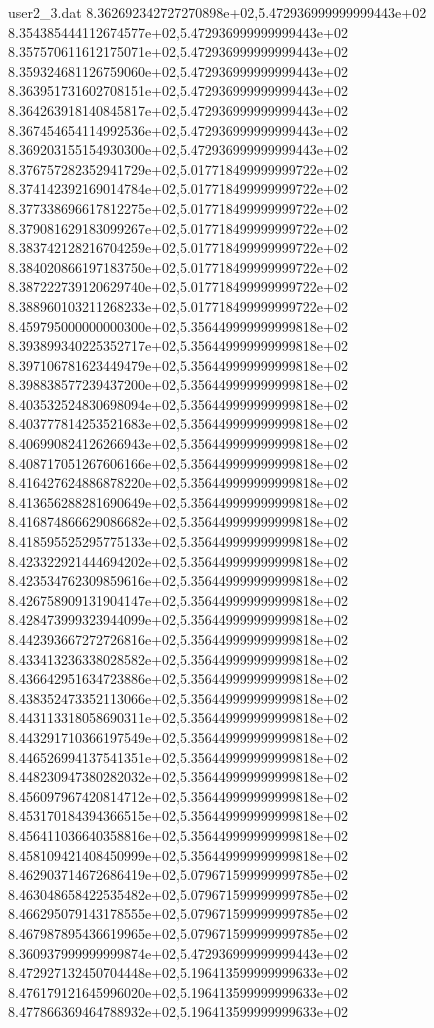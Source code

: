 \begin{filecontents}{user2_3.dat}
8.362692342727270898e+02,5.472936999999999443e+02
8.354385444112674577e+02,5.472936999999999443e+02
8.357570611612175071e+02,5.472936999999999443e+02
8.359324681126759060e+02,5.472936999999999443e+02
8.363951731602708151e+02,5.472936999999999443e+02
8.364263918140845817e+02,5.472936999999999443e+02
8.367454654114992536e+02,5.472936999999999443e+02
8.369203155154930300e+02,5.472936999999999443e+02
8.376757282352941729e+02,5.017718499999999722e+02
8.374142392169014784e+02,5.017718499999999722e+02
8.377338696617812275e+02,5.017718499999999722e+02
8.379081629183099267e+02,5.017718499999999722e+02
8.383742128216704259e+02,5.017718499999999722e+02
8.384020866197183750e+02,5.017718499999999722e+02
8.387222739120629740e+02,5.017718499999999722e+02
8.388960103211268233e+02,5.017718499999999722e+02
8.459795000000000300e+02,5.356449999999999818e+02
8.393899340225352717e+02,5.356449999999999818e+02
8.397106781623449479e+02,5.356449999999999818e+02
8.398838577239437200e+02,5.356449999999999818e+02
8.403532524830698094e+02,5.356449999999999818e+02
8.403777814253521683e+02,5.356449999999999818e+02
8.406990824126266943e+02,5.356449999999999818e+02
8.408717051267606166e+02,5.356449999999999818e+02
8.416427624886878220e+02,5.356449999999999818e+02
8.413656288281690649e+02,5.356449999999999818e+02
8.416874866629086682e+02,5.356449999999999818e+02
8.418595525295775133e+02,5.356449999999999818e+02
8.423322921444694202e+02,5.356449999999999818e+02
8.423534762309859616e+02,5.356449999999999818e+02
8.426758909131904147e+02,5.356449999999999818e+02
8.428473999323944099e+02,5.356449999999999818e+02
8.442393667272726816e+02,5.356449999999999818e+02
8.433413236338028582e+02,5.356449999999999818e+02
8.436642951634723886e+02,5.356449999999999818e+02
8.438352473352113066e+02,5.356449999999999818e+02
8.443113318058690311e+02,5.356449999999999818e+02
8.443291710366197549e+02,5.356449999999999818e+02
8.446526994137541351e+02,5.356449999999999818e+02
8.448230947380282032e+02,5.356449999999999818e+02
8.456097967420814712e+02,5.356449999999999818e+02
8.453170184394366515e+02,5.356449999999999818e+02
8.456411036640358816e+02,5.356449999999999818e+02
8.458109421408450999e+02,5.356449999999999818e+02
8.462903714672686419e+02,5.079671599999999785e+02
8.463048658422535482e+02,5.079671599999999785e+02
8.466295079143178555e+02,5.079671599999999785e+02
8.467987895436619965e+02,5.079671599999999785e+02
8.360937999999999874e+02,5.472936999999999443e+02
8.472927132450704448e+02,5.196413599999999633e+02
8.476179121645996020e+02,5.196413599999999633e+02
8.477866369464788932e+02,5.196413599999999633e+02

\end{filecontents}

